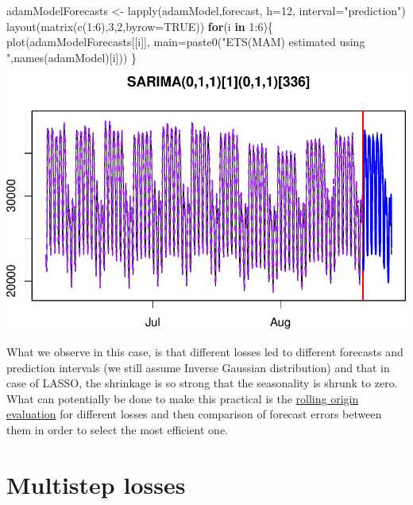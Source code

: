 \documentclass[
]{book}
\newenvironment{Shaded}{\begin{snugshade}}{\end{snugshade}}
\newcommand{\AttributeTok}[1]{\textcolor[rgb]{0.77,0.63,0.00}{#1}}
\newcommand{\ConstantTok}[1]{\textcolor[rgb]{0.00,0.00,0.00}{#1}}
\newcommand{\ControlFlowTok}[1]{\textcolor[rgb]{0.13,0.29,0.53}{\textbf{#1}}}
\newcommand{\DecValTok}[1]{\textcolor[rgb]{0.00,0.00,0.81}{#1}}
\newcommand{\FunctionTok}[1]{\textcolor[rgb]{0.00,0.00,0.00}{#1}}
\newcommand{\NormalTok}[1]{#1}
\newcommand{\OtherTok}[1]{\textcolor[rgb]{0.56,0.35,0.01}{#1}}
\newcommand{\SpecialCharTok}[1]{\textcolor[rgb]{0.00,0.00,0.00}{#1}}
\newcommand{\StringTok}[1]{\textcolor[rgb]{0.31,0.60,0.02}{#1}}
\theoremstyle{definition}
\theoremstyle{definition}
\theoremstyle{definition}
\theoremstyle{definition}
\theoremstyle{remark}
\begin{document}
\begin{Shaded}
\begin{Highlighting}[]
\NormalTok{adamModelForecasts }\OtherTok{\textless{}{-}} \FunctionTok{lapply}\NormalTok{(adamModel,forecast, }\AttributeTok{h=}\DecValTok{12}\NormalTok{, }\AttributeTok{interval=}\StringTok{"prediction"}\NormalTok{)}
\FunctionTok{layout}\NormalTok{(}\FunctionTok{matrix}\NormalTok{(}\FunctionTok{c}\NormalTok{(}\DecValTok{1}\SpecialCharTok{:}\DecValTok{6}\NormalTok{),}\DecValTok{3}\NormalTok{,}\DecValTok{2}\NormalTok{,}\AttributeTok{byrow=}\ConstantTok{TRUE}\NormalTok{))}
\ControlFlowTok{for}\NormalTok{(i }\ControlFlowTok{in} \DecValTok{1}\SpecialCharTok{:}\DecValTok{6}\NormalTok{)\{}
  \FunctionTok{plot}\NormalTok{(adamModelForecasts[[i]],}
       \AttributeTok{main=}\FunctionTok{paste0}\NormalTok{(}\StringTok{"ETS(MAM) estimated using "}\NormalTok{,}\FunctionTok{names}\NormalTok{(adamModel)[i]))}
\NormalTok{\}}
\end{Highlighting}
\end{Shaded}

\includegraphics{adam_files/figure-latex/unnamed-chunk-92-1.pdf}

What we observe in this case, is that different losses led to different forecasts and prediction intervals (we still assume Inverse Gaussian distribution) and that in case of LASSO, the shrinkage is so strong that the seasonality is shrunk to zero. What can potentially be done to make this practical is the \protect\hyperlink{rollingOrigin}{rolling origin evaluation} for different losses and then comparison of forecast errors between them in order to select the most efficient one.

\hypertarget{multistepLosses}{%
\section{Multistep losses}\label{multistepLosses}}
\end{document}
